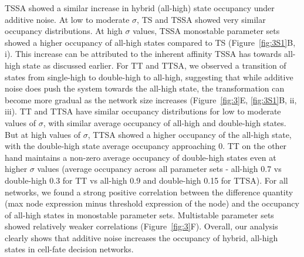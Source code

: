 \documentclass[11pt]{article}
\begin{document}
TSSA showed a similar increase in hybrid (all-high) state occupancy under additive noise. At low to moderate $\sigma$, TS and TSSA showed very similar occupancy distributions. At high $\sigma$ values, TSSA monostable parameter sets showed a higher occupancy of all-high states compared to TS (Figure~\ref{fig:3S1}B, i). This increase can be attributed to the inherent affinity TSSA has towards all-high state as discussed earlier. For TT and TTSA, we observed a transition of states from single-high to double-high to all-high, suggesting that while additive noise does push the system towards the all-high state, the transformation can become more gradual as the network size increases (Figure~\ref{fig:3}E, \ref{fig:3S1}B, ii, iii). TT and TTSA have similar occupancy distributions for low to moderate values of $\sigma$, with similar average occupancy of all-high and double-high states. But at high values of $\sigma$, TTSA showed a higher occupancy of the all-high state, with the double-high state average occupancy approaching 0. TT on the other hand maintains a non-zero average occupancy of double-high states even at higher $\sigma$ values (average occupancy across all parameter sets - all-high 0.7 vs double-high 0.3 for TT vs all-high 0.9 and double-high 0.15 for TTSA). For all networks, we found a strong positive correlation between the difference quantity (max node expression minus threshold expression of the node) and the occupancy of all-high states in monostable parameter sets. Multistable parameter sets showed relatively weaker correlations (Figure~\ref{fig:3}F). Overall, our analysis clearly shows that additive noise increases the occupancy of hybrid, all-high states in cell-fate decision networks. 
\end{document}
